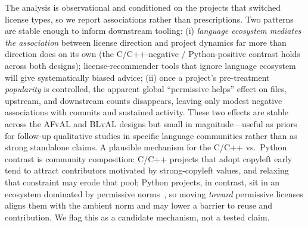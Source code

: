 The analysis is observational and conditioned on the projects that
switched license types, so we report associations rather than
prescriptions. Two patterns are stable enough to inform downstream
tooling: (i) \emph{language ecosystem mediates the association} between
license direction and project dynamics far more than direction does on
its own (the C/C++-negative / Python-positive contrast holds across both
designs); license-recommender tools that ignore language ecosystem will
give systematically biased advice; (ii) once a project's pre-treatment
\emph{popularity} is controlled, the apparent global ``permissive helps''
effect on files, upstream, and downstream counts disappears, leaving only
modest negative associations with commits and sustained activity. These
two effects are stable across the AFvAL and BLvAL designs but small in
magnitude---useful as priors for follow-up qualitative studies in specific
language communities rather than as strong standalone claims.
A plausible mechanism for the C/C++ vs.\ Python contrast is community
composition: C/C++ projects that adopt copyleft early tend to attract
contributors motivated by strong-copyleft values, and relaxing that
constraint may erode that pool; Python projects, in contrast, sit in an
ecosystem dominated by permissive norms~\cite{lerner2005economics}, so
moving \emph{toward} permissive licenses aligns them with the ambient
norm and may lower a barrier to reuse and contribution. We flag this
as a candidate mechanism, not a tested claim.
